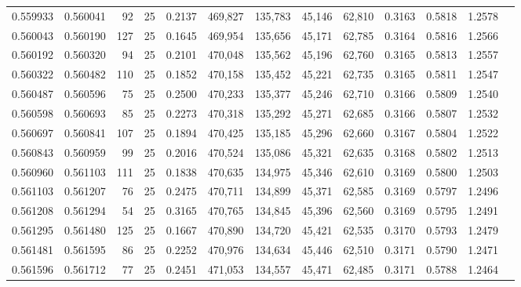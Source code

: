 \begin{tabular}{rrrrrrrrrrrrr}
0.559933 & 0.560041 &    92 &  25 &                                     0.2137 & 469,827 & 135,783 &  45,146 &  62,810 & 0.3163 & 0.5818 & 1.2578 \\
0.560043 & 0.560190 &   127 &  25 &                                     0.1645 & 469,954 & 135,656 &  45,171 &  62,785 & 0.3164 & 0.5816 & 1.2566 \\
0.560192 & 0.560320 &    94 &  25 &                                     0.2101 & 470,048 & 135,562 &  45,196 &  62,760 & 0.3165 & 0.5813 & 1.2557 \\
0.560322 & 0.560482 &   110 &  25 &                                     0.1852 & 470,158 & 135,452 &  45,221 &  62,735 & 0.3165 & 0.5811 & 1.2547 \\
0.560487 & 0.560596 &    75 &  25 &                                     0.2500 & 470,233 & 135,377 &  45,246 &  62,710 & 0.3166 & 0.5809 & 1.2540 \\
0.560598 & 0.560693 &    85 &  25 &                                     0.2273 & 470,318 & 135,292 &  45,271 &  62,685 & 0.3166 & 0.5807 & 1.2532 \\
0.560697 & 0.560841 &   107 &  25 &                                     0.1894 & 470,425 & 135,185 &  45,296 &  62,660 & 0.3167 & 0.5804 & 1.2522 \\
0.560843 & 0.560959 &    99 &  25 &                                     0.2016 & 470,524 & 135,086 &  45,321 &  62,635 & 0.3168 & 0.5802 & 1.2513 \\
0.560960 & 0.561103 &   111 &  25 &                                     0.1838 & 470,635 & 134,975 &  45,346 &  62,610 & 0.3169 & 0.5800 & 1.2503 \\
0.561103 & 0.561207 &    76 &  25 &                                     0.2475 & 470,711 & 134,899 &  45,371 &  62,585 & 0.3169 & 0.5797 & 1.2496 \\
0.561208 & 0.561294 &    54 &  25 &                                     0.3165 & 470,765 & 134,845 &  45,396 &  62,560 & 0.3169 & 0.5795 & 1.2491 \\
0.561295 & 0.561480 &   125 &  25 &                                     0.1667 & 470,890 & 134,720 &  45,421 &  62,535 & 0.3170 & 0.5793 & 1.2479 \\
0.561481 & 0.561595 &    86 &  25 &                                     0.2252 & 470,976 & 134,634 &  45,446 &  62,510 & 0.3171 & 0.5790 & 1.2471 \\
0.561596 & 0.561712 &    77 &  25 &                                     0.2451 & 471,053 & 134,557 &  45,471 &  62,485 & 0.3171 & 0.5788 & 1.2464 \\

\end{tabular}
